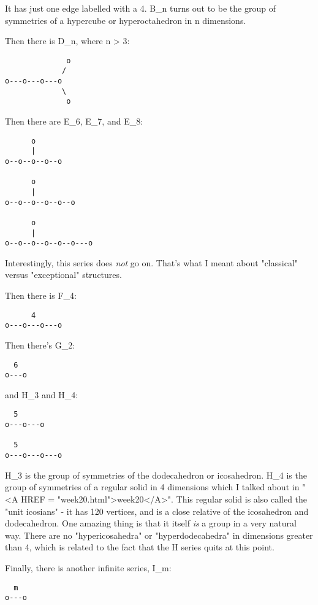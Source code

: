 It has just one edge labelled with a 4.   B_{n} turns out to be
the group of symmetries of a hypercube or hyperoctahedron in n
dimensions.  

Then there is D_{n}, where n > 3:

\begin{verbatim}
              o
             /
o---o---o---o
             \
              o
\end{verbatim}
    

Then there are E_{6}, E_{7}, and E_{8}:

\begin{verbatim}
      o
      |
o--o--o--o--o

      o
      |
o--o--o--o--o--o

      o
      | 
o--o--o--o--o--o---o
\end{verbatim}
    

Interestingly, this series does \emph{not} go on.  That's what I meant
about "classical" versus "exceptional" structures.  

Then there is F_{4}:

\begin{verbatim}
      4
o---o---o---o
\end{verbatim}
    

Then there's G_{2}:

\begin{verbatim}
  6
o---o
\end{verbatim}
    

and H_{3} and H_{4}:

\begin{verbatim}
  5
o---o---o

  5
o---o---o---o
\end{verbatim}
    


H_{3} is the group of symmetries of the dodecahedron or
icosahedron.  H_{4} is the group of symmetries of a regular
solid in 4 dimensions which I talked about in "<A HREF =
"week20.html">week20</A>".  This regular solid is also
called the "unit icosians" - it has 120 vertices, and is a
close relative of the icosahedron and dodecahedron.  One amazing thing
is that it itself \emph{is} a group in a very natural way.  There are no
"hypericosahedra" or "hyperdodecahedra" in
dimensions greater than 4, which is related to the fact that the H
series quits at this point.

Finally, there is another infinite series, I_{m}:

\begin{verbatim}
  m
o---o
\end{verbatim}
    

